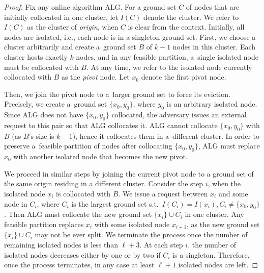 \documentclass[a4paper,anonymous,USenglish]{lipics-v2019}
\newcommand{\ALG}{\textsc{ALG}\xspace}
\begin{document}
\begin{proof}
	Fix any online algorithm \ALG.
	For a ground set $C$ of nodes that are initially collocated in one cluster,
	let $I(C)$ denote the cluster.
	We refer to $I(C)$ as the cluster of \emph{origin},
	when $C$ is clear from the context.
	Initially, all nodes are isolated, i.e., each node is in a singleton ground set.
	First, we choose a cluster arbitrarily and
	 create a~ground set $B$ of $k-1$ nodes in this cluster.
	Each cluster hosts exactly $k$ nodes, and in any feasible partition,
	 a~single isolated node must be collocated with $B$.
	At any time,
	we refer to the isolated node currently collocated with $B$ as the \emph{pivot} node.
	Let $x_0$ denote the first pivot node.

	Then, we join the pivot node to a~larger ground set to force its eviction.
	Precisely,
	we create a~ground set $\{x_0, y_0\}$, 	where
	 $y_0$ is an arbitrary isolated node.
	Since \ALG does not have $\{x_0,y_0\}$ collocated, 
	the adversary issues an external request to this pair so that \ALG collocates it.
	\ALG cannot collocate $\{x_0, y_0\}$ with $B$ (as $B$'s size is $k-1$), hence it collocates them in a~different cluster.
	In order to preserve a~feasible partition of nodes after collocating $\{x_0, y_0\}$,
	\ALG must replace $x_0$ with another isolated node that becomes the new pivot.

	We proceed in similar steps by joining the current pivot node to a ground set of the same origin residing in a different cluster.
	Consider the step $i$,
	when the isolated node $x_i$ is collocated with $B$.
	 We issue a request between $x_i$ and some node in $C_i$,
	 where $C_i$ is the largest ground set
	 s.t.~$I(C_i) = I(x_i), C_i \neq \{x_0,y_0\}$.
	 Then \ALG must collocate the new ground set
	  $\{x_i\} \cup C_i $ in one cluster.
	Any feasible partition replaces $x_i$ with some isolated node $x_{i+1}$,
	as the new ground set $\{x_i\} \cup C_i $  may not be ever split.
	We terminate the process once the number of remaining isolated nodes 
	is less than $\ell+3$.
	At each step $i$,
	the number of isolated nodes decreases either by one
	 or by two if $C_i$ is a singleton.
	Therefore, once the process terminates,
	in any case at least $\ell+1$ isolated nodes are left.
	

\end{proof}
\end{document}
